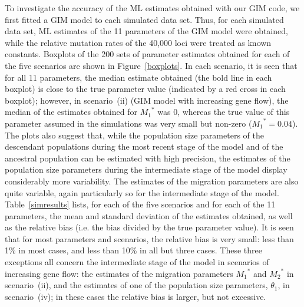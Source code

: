 \documentclass[11pt]{article}
\begin{document}
To investigate the accuracy of the ML estimates obtained with our GIM code, we first fitted a GIM model to each simulated data set. Thus, for each simulated data set, ML estimates of the 11 parameters of the GIM model were obtained, while the relative mutation rates of the 40,000 loci were treated as known constants. Boxplots of the 200 sets of parameter estimates obtained for each of the five scenarios are shown in Figure~\ref{boxplots}. 
In each scenario, it is seen that for all 11 parameters, the median estimate obtained (the bold line in each boxplot) is close to the true parameter value (indicated by a red cross in each boxplot); however, in scenario~(ii) (GIM model with increasing gene flow), the median of the estimates obtained for ${M_1}^{\!*}$ was $0$, whereas the true value of this parameter assumed in the simulations was very small but non-zero (${M_1}^{\!*}=0.04$). The plots also suggest that, while the population size parameters of the descendant populations during the most recent stage of the model and of the ancestral population can be estimated with high precision, the estimates of the population size parameters during the intermediate stage of the model display
 considerably more variability. The estimates of the migration parameters are also quite variable, 
again particularly so for the intermediate stage of the model. 
Table~\ref{simresults} lists, for each of the five scenarios and for each of the 11 parameters, the mean and standard deviation of the estimates obtained, as well as the relative bias (i.e. the bias divided by the true parameter value).
It is seen that for most parameters and scenarios, the relative bias is very small: less than 1\% in most cases, and less than 10\% in all but three cases. These three exceptions all concern 
the intermediate stage of the model in scenarios of increasing gene flow: the estimates of the migration parameters ${M_1}^{\!*}$ and ${M_2}^{\!*}$ in scenario~(ii), and the estimates of one of the population size parameters, 
$\theta_1$, in scenario~(iv); 
in these cases the relative bias is larger, but not excessive.
\end{document}
